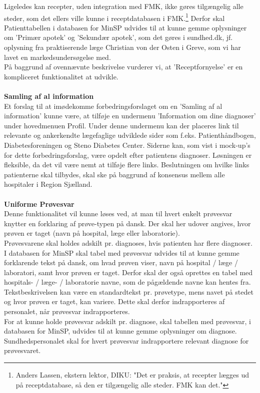 Ligeledes kan recepter, uden integration med FMK, ikke gøres tilgængelig alle steder, som det ellers ville kunne i receptdatabasen i FMK.\footnote{Anders Lassen, ekstern lektor, DIKU: "Det er praksis, at recepter lægges ud på receptdatabase, så den er tilgængelig alle steder. FMK kan det."} Derfor skal Patienttabellen i databasen for MinSP  udvides til at kunne gemme oplysninger om 'Primær apotek' og 'Sekundær apotek', som det gøres i sundhed.dk, jf. oplysning fra praktiserende læge Christian von der Osten i Greve, som vi har lavet en markedsundersøgelse med.\\ 
På baggrund af ovennævnte beskrivelse vurderer vi, at 'Receptfornyelse' er en kompliceret funktionalitet at udvikle.
\\\\
\textbf{Samling af al information} \\
Et forslag til at imødekomme forbedringsforslaget om en 'Samling af al information' kunne være, at tilføje en undermenu 'Information om dine diagnoser' under hovedmenuen Profil. Under denne undermenu kan der placeres link til relevante og ankerkendte lægefaglige udviklede sider som f.eks. Patienthåndbogen, Diabetesforeningen og Steno Diabetes Center. Siderne kan, som vist i mock-up's for dette forbedringsforslag, være opdelt efter patientens diagnoser. Løsningen er fleksible, da det vil være nemt at tilføje flere links. Beslutningen om hvilke links patienterne skal tilbydes, skal ske på baggrund af konsensus mellem alle hospitaler i Region Sjælland. 
\\\\ 
\textbf{Uniforme Prøvesvar} \\
Denne funktionalitet vil kunne løses ved, at man til hvert enkelt prøvesvar knytter en forklaring af prøve-typen på dansk. Der skal her udover angives, hvor prøven er taget (navn på hospital, læge eller laboratorie).\\
Prøvesvarene skal holdes adskilt pr. diagnoses, hvis patienten har flere diagnoser.\\
I databasen for MinSP skal tabel med prøvesvar udvides til at kunne gemme forklarende tekst på dansk, om hvad prøven viser, navn på hospital / læge / laboratori, samt hvor prøven er taget. Derfor skal der også oprettes en tabel med hospitals- / læge- / laboratorie navne, som de pågældende navne kan hentes fra.\\ 
Tekstbeskrivelsen kan være en standardtekst pr. prøvetype, mens navet på stedet og hvor prøven er taget, kan variere. Dette skal derfor indrapporteres af personalet, når prøvesvar indrapporteres. \\
For at kunne holde prøvesvar adskilt pr. diagnose, skal tabellen med prøvesvar, i databasen for MinSP, udvides til at kunne gemme oplysninger om diagnose. Sundhedspersonalet skal for hvert prøvesvar indrapportere relevant diagnose for prøvesvaret. 
